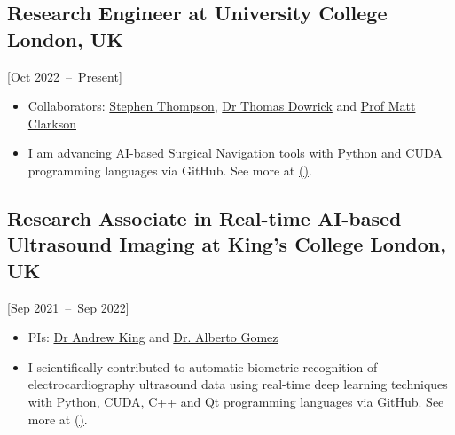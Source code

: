 \documentclass{mycv}
\begin{document}
\subsection{Research Engineer at University College London, UK}[Oct 2022~--~Present]
\begin{itemize}
  \item Collaborators: \href{https://scholar.google.co.uk/citations?user=-rD4cJIAAAAJ}{Stephen Thompson},  \href{https://iris.ucl.ac.uk/iris/browse/profile?upi=TMDOW59}{Dr Thomas Dowrick} and \href{https://iris.ucl.ac.uk/iris/browse/profile?upi=MJCLA42}{Prof Matt Clarkson}
  \item 
I am advancing AI-based Surgical Navigation tools with Python and CUDA programming languages via GitHub.
See more at \href{https://github.com/SciKit-Surgery}{(\faExternalLink*)}.
\end{itemize}


\subsection{Research Associate in Real-time AI-based Ultrasound Imaging at King's College London, UK}[Sep 2021~--~Sep 2022]
\begin{itemize}
  \item PIs: \href{http://kclmmag.org/}{Dr Andrew King} and  \href{https://gomezalberto.github.io/}{Dr. Alberto Gomez}
  \item 
I scientifically contributed to automatic biometric recognition of electrocardiography ultrasound data using real-time deep learning techniques with Python, CUDA, C++ and Qt programming languages via GitHub.
See more at \href{http://vital.oucru.org/major-partners/kings-college-london/}{(\faExternalLink*)}.
\end{itemize}
\end{document}
